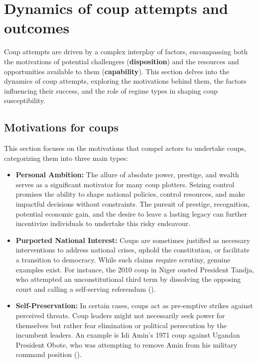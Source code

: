 \documentclass[
  12pt,
]{report}
\begin{document}
\section{Dynamics of coup attempts and
outcomes}\label{dynamics-of-coup-attempts-and-outcomes}

Coup attempts are driven by a complex interplay of factors, encompassing
both the motivations of potential challengers (\textbf{disposition}) and
the resources and opportunities available to them (\textbf{capability}).
This section delves into the dynamics of coup attempts, exploring the
motivations behind them, the factors influencing their success, and the
role of regime types in shaping coup susceptibility.

\subsection{Motivations for coups}\label{motivations-for-coups}

This section focuses on the motivations that compel actors to undertake
coups, categorizing them into three main types:

\begin{itemize}
\item
  \textbf{Personal Ambition:} The allure of absolute power, prestige,
  and wealth serves as a significant motivator for many coup plotters.
  Seizing control promises the ability to shape national policies,
  control resources, and make impactful decisions without constraints.
  The pursuit of prestige, recognition, potential economic gain, and the
  desire to leave a lasting legacy can further incentivize individuals
  to undertake this risky endeavour.
\item
  \textbf{Purported National Interest:} Coups are sometimes justified as
  necessary interventions to address national crises, uphold the
  constitution, or facilitate a transition to democracy. While such
  claims require scrutiny, genuine examples exist. For instance, the
  2010 coup in Niger ousted President Tandja, who attempted an
  unconstitutional third term by dissolving the opposing court and
  calling a self-serving referendum
  ().
\item
  \textbf{Self-Preservation:} In certain cases, coups act as pre-emptive
  strikes against perceived threats. Coup leaders might not necessarily
  seek power for themselves but rather fear elimination or political
  persecution by the incumbent leaders. An example is Idi Amin's 1971
  coup against Ugandan President Obote, who was attempting to remove
  Amin from his military command position
  ().
\end{itemize}
\end{document}
